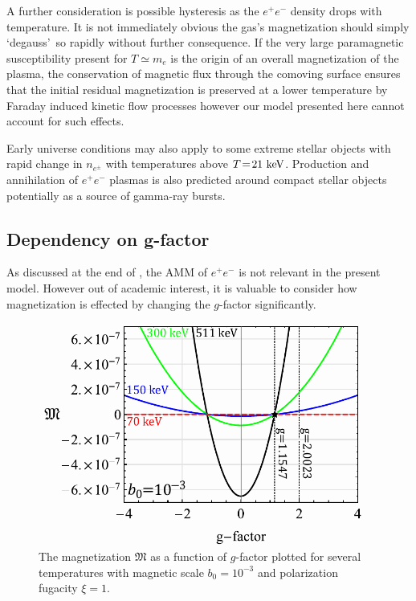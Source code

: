 A further consideration is possible hysteresis as the $e^{+}e^{-}$ density drops with temperature. It is not immediately obvious the gas's magnetization should simply \lq degauss\rq\ so rapidly without further consequence. If the very large paramagnetic susceptibility present for $T\simeq m_{e}$ is the origin of an overall magnetization of the plasma, the conservation of magnetic flux through the comoving surface ensures that the initial residual magnetization is preserved at a lower temperature by Faraday induced kinetic flow processes however our model presented here cannot account for such effects.

Early universe conditions may also apply to some extreme stellar objects with rapid change in $n_{e^{\pm}}$ with temperatures above $T\!=\!21\text{ keV}$. Production and annihilation of $e^{+}e^{-}$ plasmas is also predicted around compact stellar objects~\citep{Ruffini:2009hg,Ruffini:2012it} potentially as a source of gamma-ray bursts.

\subsection{Dependency on g-factor}
\label{sec:gfac}

\noindent As discussed at the end of , the AMM of $e^{+}e^{-}$ is not relevant in the present model. However out of academic interest, it is valuable to consider how magnetization is effected by changing the $g$-factor significantly.

\begin{figure}[h]
 \centering
 \includegraphics[width=0.95\textwidth]{plots/chap04cosmo/thesis_gfac.pdf}
 \caption{The magnetization $\mathfrak M$ as a function of $g$-factor plotted for several temperatures with magnetic scale $b_{0}=10^{-3}$ and polarization fugacity $\xi=1$.}
 \label{fig:gfac} 
\end{figure}

